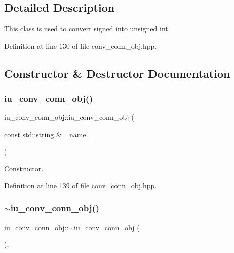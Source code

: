 \subsection{Detailed Description}
This class is used to convert signed into unsigned int. 

Definition at line 130 of file conv\+\_\+conn\+\_\+obj.\+hpp.



\subsection{Constructor \& Destructor Documentation}
\mbox{\label{classiu__conv__conn__obj_a29880639aabd922754831c322c479f56}} 
\subsubsection{\texorpdfstring{iu\+\_\+conv\+\_\+conn\+\_\+obj()}{iu\_conv\_conn\_obj()}}
{\footnotesize\ttfamily iu\+\_\+conv\+\_\+conn\+\_\+obj\+::iu\+\_\+conv\+\_\+conn\+\_\+obj (\begin{DoxyParamCaption}\item[{const std\+::string \&}]{\+\_\+name }\end{DoxyParamCaption})\hspace{0.3cm}{\ttfamily [inline]}}



Constructor. 



Definition at line 139 of file conv\+\_\+conn\+\_\+obj.\+hpp.

\mbox{\label{classiu__conv__conn__obj_a59949dfafabe80989259250255f5a8ed}} 
\subsubsection{\texorpdfstring{$\sim$iu\+\_\+conv\+\_\+conn\+\_\+obj()}{~iu\_conv\_conn\_obj()}}
{\footnotesize\ttfamily iu\+\_\+conv\+\_\+conn\+\_\+obj\+::$\sim$iu\+\_\+conv\+\_\+conn\+\_\+obj (\begin{DoxyParamCaption}{ }\end{DoxyParamCaption})\hspace{0.3cm}{\ttfamily [override]}, {\ttfamily [default]}}




